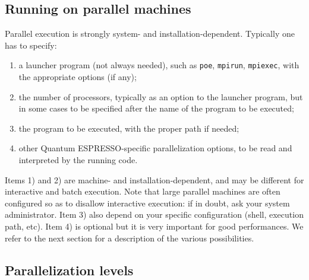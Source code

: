 \documentclass[12pt,a4paper]{article}
\def\qe{{\sc Quantum ESPRESSO}}
\begin{document}
\subsection{Running on parallel machines}
\label{SubSec:para}

Parallel execution is strongly system- and installation-dependent. 
Typically one has to specify:
\begin{enumerate}
\item a launcher program (not always needed), 
such as \texttt{poe}, \texttt{mpirun}, \texttt{mpiexec},
  with the  appropriate options (if any);
\item the number of processors, typically as an option to the launcher
  program, but in some cases to be specified after the name of the
  program to be
  executed; 
\item the program to be executed, with the proper path if needed; 
\item other \qe-specific parallelization options, to be
  read and interpreted by the running code.
\end{enumerate}  
Items 1) and 2) are machine- and installation-dependent, and may be 
different for interactive and batch execution. Note that large
parallel machines are  often configured so as to disallow interactive
execution: if in doubt, ask your system administrator.
Item 3) also depend on your specific configuration (shell, execution path, etc). 
Item 4) is optional but it is very important
for good performances. We refer to the next
section for a description of the various 
possibilities.

\subsection{Parallelization levels}
\end{document}
